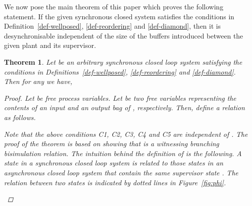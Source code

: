 \documentclass[copyright]{eptcs}
\theoremstyle{plain}
\newtheorem{theorem}{Theorem}[section]
\theoremstyle{definition}
\begin{document}
We now pose the main theorem of this paper which proves the following statement. If the given synchronous closed system satisfies the conditions in Definition~\ref{def-wellposed}, \ref{def-reordering} and \ref{def-diamond}, then it is desynchronisable independent of the size of the buffers introduced between the given plant and its supervisor. 
\begin{theorem}\label{thm:char}
Let  be an arbitrary synchronous closed loop system satisfying the conditions in Definitions~\ref{def-wellposed}, \ref{def-reordering} and \ref{def-diamond}. Then for any  we have, 
\begin{proof}
Let  be free process variables. Let  be two free variables representing the contents of an input and an output bag of , respectively. Then, define a relation  as follows.

Note that the above conditions C1, C2, C3, C4 and C5 are independent of . The proof of the theorem is based on showing that  is a witnessing branching bisimulation relation. The intuition behind the definition of  is the following. A state  in a synchronous closed loop system is related to those states in an asynchronous closed loop system that contain the same supervisor state . The  relation between two states is indicated by dotted lines in Figure~\ref{fig:phi}.
\begin{figure}
        \centering
\end{figure}
\end{proof}
\end{theorem}
\end{document}
